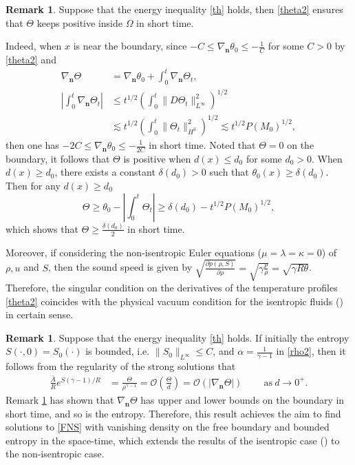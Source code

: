 \documentclass[12pt,a4paper]{amsart}
\numberwithin{equation}{section}
\theoremstyle{plain}
\theoremstyle{definition}
\newtheorem{Rem}[Thm]{Remark}
\begin{document}
\begin{Rem}\label{physical vacuum}
	Suppose that the energy inequality \eqref{th} holds, then \eqref{theta2} ensures that $\Theta$ keeps positive inside $\Omega$ in short time.
	
	Indeed, when $x$ is near the boundary, since $-C\leq\nabla_{\mathbf{n}} \theta_0\leq-\frac{1}{C}$ for some $C>0$ by \eqref{theta2} and 
    \begin{align*}
    \nabla_{\mathbf{n}} \Theta&=\nabla_{\mathbf{n}} \theta_0+ \int_{0}^{t} \nabla_{\mathbf{n}} \Theta_t,\\
    \left|\int_{0}^{t} \nabla_{\mathbf{n}} \Theta_t\right|
    &\leq t^{1/2}\left(\int_{0}^{t}\|D\Theta_t\|_{L^{\infty}}^2\right)^{1/2}\\
    &\lesssim t^{1/2}\left(\int_{0}^{t}\|\Theta_t\|_{H^3}^2\right)^{1/2}
    \lesssim t^{1/2}P(M_0)^{1/2},
    \end{align*}
	then one has $-2C\leq\nabla_{\mathbf{n}} \theta_0\leq-\frac{1}{2C}$ in short time.
	Noted that $\Theta=0$ on the boundary, it follows that  $\Theta$ is positive when $d(x)\leq d_0$ for some $d_0>0$.
	When $d(x)\geq d_0$, there exists a constant $\delta(d_0)>0$ such that $\theta_0(x)\geq \delta(d_0)$.
	Then for any $d(x)\geq d_0$
	\begin{equation*}
	\Theta\geq\theta_0-\left|\int_{0}^{t} \Theta_t \right|\geq \delta(d_0)-t^{1/2}P(M_0)^{1/2},
	\end{equation*}  
	which shows that $\Theta\geq \frac{\delta(d_0)}{2}$ in short time.
	
	Moreover, if considering the non-isentropic Euler equations ($\mu=\lambda=\kappa=0$) of $\rho, u$ and $S$, then the sound speed is given by $\sqrt{\frac{\partial p(\rho, S)}{\partial \rho}}=\sqrt{\gamma \frac{p}{\rho}}=\sqrt{\gamma R\theta}$.
    Therefore, the singular condition on the derivatives of the temperature profiles \eqref{theta2} coincides with the physical vacuum condition for the isentropic fluids (\cite{Jang2009, Coutand2011, Luo2014}) in certain sense. 
\end{Rem}

\begin{Rem}
	\label{rem_entropy}
	Suppose that the energy inequality \eqref{th} holds. 
	If initially the entropy $S(\cdot,0)=S_0(\cdot)$ is bounded, i.e. $\|S_0\|_{L^{\infty}} \leq C$, and $\alpha=\frac{1}{\gamma-1}$ in \eqref{rho2}, then it follows from the regularity of the strong solutions that 
	\begin{align*}
	\frac{\bar A}{R}e^{S(\gamma-1)/R}&=\frac{\Theta}{\rho^{\gamma-1}}
	=\mathcal{O}(\frac{\Theta}{d})=\mathcal{O}(|\nabla_{\mathbf{n}} \Theta|)~\qquad\text{as}~d\rightarrow 0^+.
	\end{align*}
	Remark \ref{physical vacuum} has shown that $\nabla_{\mathbf{n}}\Theta$ has upper and lower bounds on the boundary in short time, and so is the entropy.
	Therefore, this result achieves the aim to find solutions to \eqref{FNS} with vanishing density on the free boundary and bounded entropy in the space-time, which extends the results of the isentropic case (\cite{Coutand2012, Jang2015, Jang2010}) to the non-isentropic case.
\end{Rem}
\end{document}
